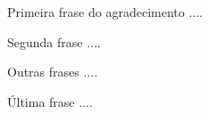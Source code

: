 \begin{agradecimentos}
	Primeira frase do agradecimento ....
	
	Segunda frase ....
	
	Outras frases ....
	
	\'Ultima frase ....
	
\end{agradecimentos}
